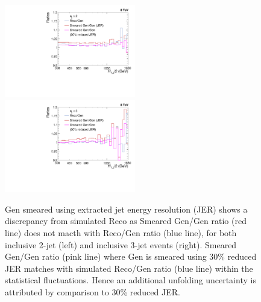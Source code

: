 \begin{figure}[!htbp]
 \begin{center}
 \includegraphics[width=0.51\textwidth]{Plots_HT_2_150/Ratio_Reco_2_crystal.pdf}%
 ~~\includegraphics[width=0.51\textwidth]{Plots_HT_2_150/Ratio_Reco_3_crystal.pdf}\\
 \caption{\MadGraphF \plus \PYTHIAS Gen smeared using extracted jet energy resolution (JER) shows a discrepancy from simulated Reco as Smeared Gen/Gen ratio (red line) does not macth with Reco/Gen ratio (blue line), for both inclusive 2-jet (left) and inclusive 3-jet events (right). Smeared Gen/Gen ratio (pink line) where Gen is smeared using 30\% reduced JER matches with simulated Reco/Gen ratio (blue line) within the statistical fluctuations. Hence an additional unfolding uncertainty is attributed by comparison to 30\% reduced JER.}
 \label{fig:ratios}
 \end{center}
\end{figure}

